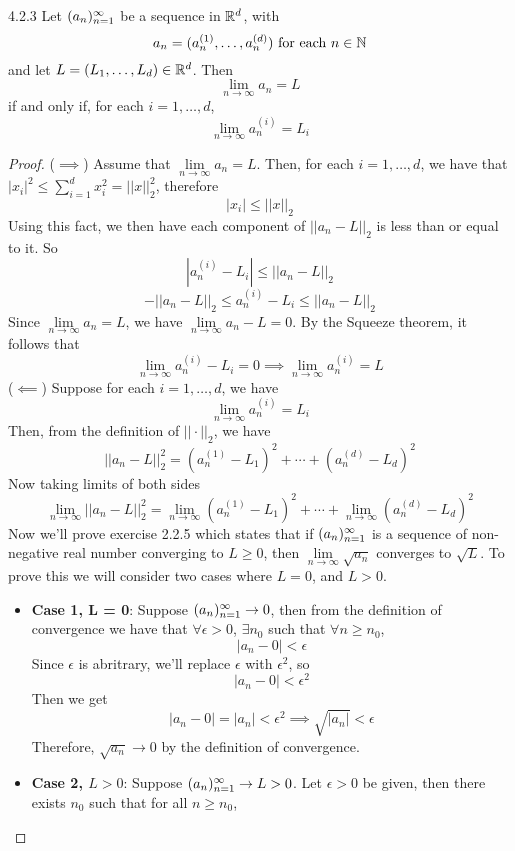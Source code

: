\documentclass[openany]{report}
\begin{document}
\begin{manualprop}{4.2.3}
    Let $({a}_n)_{n=1}^\infty$ be a sequence in $\mathbb{R}^d$, with 
    \[a_n = (a_n^{(1)}, \ldots, a_n^{(d)}) \text { for each } n \in \mathbb{N}\]
    and let $L = (L_1, \ldots, L_d) \in \mathbb{R}^d$. Then
    \[\lim_{n\rightarrow\infty} a_n = L\]
    if and only if, for each $i = 1, \ldots, d$,
    \[\lim_{n\rightarrow\infty} a_n^{(i)} = L_i\]
\end{manualprop}
\begin{proof}
    ($\implies$) Assume that $\lim\limits_{n\rightarrow\infty} a_n = L$. Then, for each $i = 1, \ldots, d$, we have that $|x_i|^2 \leq \sum_{i=1}^{d} x_i^2 = ||x||_2^2$, therefore 
    \[|x_i| \leq ||x||_2\]
    Using this fact, we then have each component of $||a_n - L||_2$ is less than or equal to it. So 
    \[|a_n^{(i)} - L_i| \leq ||a_n - L||_2\]
    \[-||a_n - L||_2 \leq a_n^{(i)} - L_i \leq ||a_n-L||_2\]
    Since $\lim\limits_{n\rightarrow \infty}a_n = L$, we have 
    $\lim\limits_{n\rightarrow\infty} a_n - L = 0$. By the Squeeze theorem, it follows that 
    \[\lim_{n \rightarrow \infty} a_n^{(i)} - L_i = 0 \implies \lim_{n\rightarrow \infty} a_n^{(i)} = L\]
    ($\impliedby$) Suppose for each $i = 1, \ldots, d$, we have 
    \[\lim_{n\rightarrow\infty} a_n^{(i)} = L_i\]
    Then, from the definition of $||\cdot||_2$, we have 
    \[||a_n -L||_2^2 = (a_n^{(1)} - L_1)^2 + \cdots + (a_n^{(d)} - L_d)^2\]
    Now taking limits of both sides
    \[\lim_{n\rightarrow\infty} ||a_n - L||_2^2 = \lim_{n\rightarrow\infty} (a_n^{(1)} - L_1)^2 + \cdots + \lim_{n\rightarrow\infty} (a_n^{(d)} - L_d)^2\]
    Now we'll prove exercise 2.2.5 which states that if $({a}_n)_{n=1}^\infty$ is a sequence of non-negative real number converging to $L \geq 0$, then $\lim\limits_{n \rightarrow \infty} \sqrt{a_n}$ converges to $\sqrt{L}$. To prove this we will consider two cases where $L = 0$, and $L > 0$. 
    \begin{itemize}
        \item \textbf{Case 1, L = 0}: Suppose $({a}_n)_{n=1}^\infty \rightarrow 0$, then from the definition of convergence we have that $\forall \epsilon > 0$, $\exists n_0$ such that $\forall n \geq n_0$, 
        \[|a_n - 0| < \epsilon\]
        Since $\epsilon$ is abritrary, we'll replace $\epsilon$ with $\epsilon^2$, so 
        \[|a_n - 0| < \epsilon^2\]
        Then we get 
        \[|a_n - 0| = |a_n| < \epsilon^2 \implies \sqrt{|a_n|} < \epsilon\]
        Therefore, $\sqrt{a_n} \rightarrow 0$ by the definition of convergence.
        \item \textbf{Case 2, $L > 0$}: Suppose $({a}_n)_{n=1}^\infty \rightarrow L > 0$. Let $\epsilon >0$ be given, then there exists $n_0$ such that for all $n \geq n_0$,

\end{itemize}
\end{proof}
\end{document}
